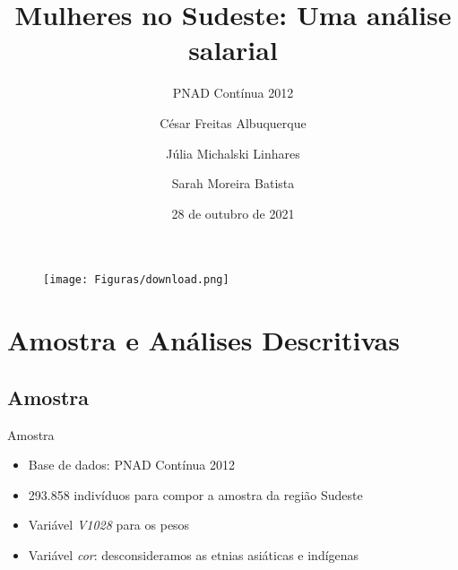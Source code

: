 \documentclass[xcolor={dvipsnames}]{beamer}
\title[Mulheres no Sudeste]{Mulheres no Sudeste: Uma análise salarial}
\subtitle{PNAD Contínua 2012}
\author[Albuquerque \and Linhares \and Batista]{César Freitas Albuquerque \and Júlia Michalski Linhares \and Sarah Moreira Batista}
\institute[UnB]{UnB - Universidade de Brasília}
\date{28 de outubro de 2021}
\begin{document}
\begin{frame}
    \titlepage
    \begin{figure}[htpb]
            \texttt{[image: Figuras/download.png]}
    \end{figure}
\end{frame}


\begin{frame}
    \tableofcontents
\end{frame}

\section{Amostra e Análises Descritivas}
\begin{frame}
    \tableofcontents[currentsection]
\end{frame}
\subsection{Amostra}
\begin{frame}{Amostra}
    \begin{itemize}
        \item Base de dados: PNAD Contínua 2012
        \item 293.858 indivíduos para compor a amostra da região Sudeste
        \item Variável \textit{V1028} para os pesos
        \item Variável \textit{cor}: desconsideramos as etnias asiáticas e indígenas
    \end{itemize}
\end{frame}
\end{document}
